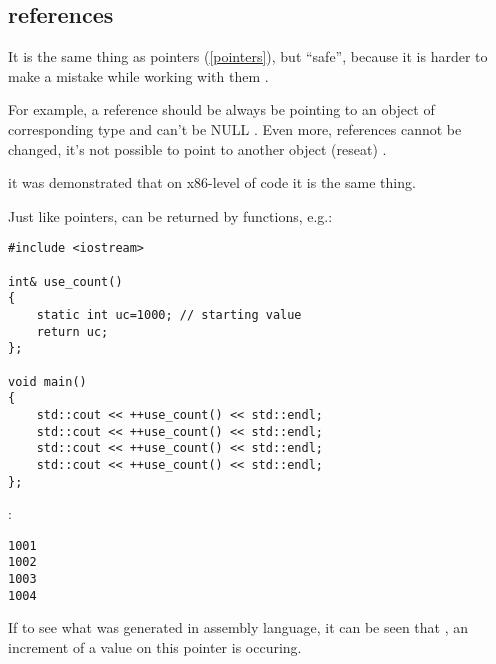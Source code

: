 ﻿\subsection{references}

{It is the same thing as pointers (\ref{pointers}), but ``safe'', 
because it is harder to make a mistake while working with them}
\cite[8.3.2]{CPP11}.

{For example, a reference should be always be pointing to an object of corresponding type and can't be NULL}
\cite[8.6]{ParashiftCPPFAQ}.
{Even more, references cannot be changed, it's not possible to point to another object (reseat)}
\cite[8.5]{ParashiftCPPFAQ}.

 \cite[1.7.1]{REBook} 
{it was demonstrated that on x86-level of code it is the same thing}.

{Just like pointers,  can be returned by functions, e.g.}:

\begin{lstlisting}
#include <iostream>
 
int& use_count()
{
	static int uc=1000; // starting value
	return uc;
};
 
void main()
{
	std::cout << ++use_count() << std::endl;
	std::cout << ++use_count() << std::endl;
	std::cout << ++use_count() << std::endl;
	std::cout << ++use_count() << std::endl;
};
\end{lstlisting}

:

\begin{lstlisting}
1001
1002
1003
1004
\end{lstlisting}

{If to see what was generated in assembly language, it can be seen that}  
 , 
  
{an increment of a value on this pointer is occuring}.

